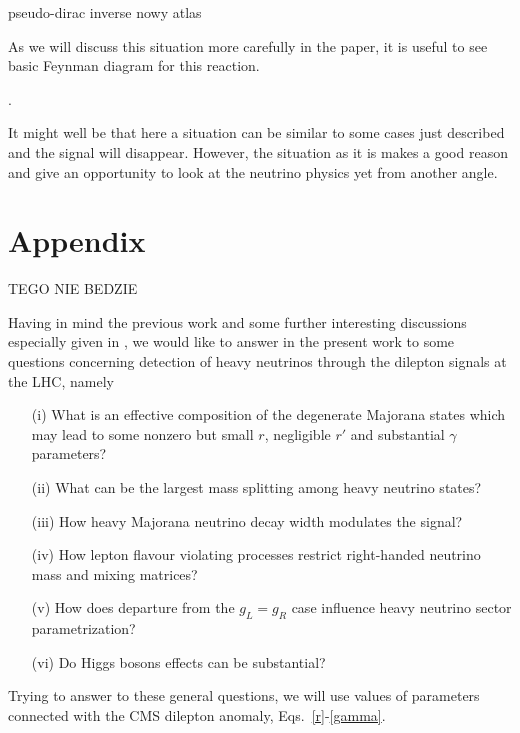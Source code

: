 \documentclass[twocolumn,superscriptaddress,showpacs,prl,nofootinbib,floatfix]{revtex4}
\begin{document}
pseudo-dirac inverse
\cite{Chen:2011hc}
\cite{Han:2006ip}
\cite{delAguila:2007em}
\cite{Mohapatra:1986aw}
nowy atlas \cite{Aad:2015xaa}

 
As we will discuss this situation more carefully in the paper, it is useful to see basic Feynman diagram for this reaction. 

.

It might well be that here a situation can be similar to some cases just described and the signal will disappear. However, the situation as it is makes a good reason and give an opportunity to look at the neutrino physics yet from another angle. 

  

\section{Appendix}

TEGO NIE BEDZIE

Having in mind the previous work \cite{Gluza:2015goa} and some further interesting discussions especially given in  \cite{Dobrescu:2015qna,Brehmer:2015cia,Coloma:2015una,Dev:2015pga}, we would like to answer in the present work to some  questions concerning detection of heavy neutrinos through the dilepton signals at the LHC, namely  

\begin{itemize}
\item[(i)] What is an effective composition of the degenerate Majorana states which may lead
to some nonzero but small $r$, negligible $r'$ and substantial $\gamma$ parameters?
\item[(ii)] What can be the largest mass splitting among heavy neutrino states?
\item[(iii)] How heavy Majorana neutrino decay width modulates the signal?
\item[(iv)] How lepton flavour violating processes restrict right-handed neutrino mass and mixing matrices?
\item[(v)] How does departure from the $g_L=g_R$ case influence heavy neutrino sector parametrization?
\item[(vi)] Do Higgs bosons effects can be substantial?
\end{itemize}

Trying to answer to these general questions, we will use values of parameters connected with the CMS dilepton anomaly, Eqs.~\ref{r}-\ref{gamma}. 
\end{document}
